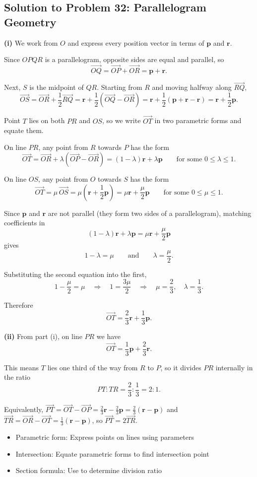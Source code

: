 \subsection{Solution to Problem 32: Parallelogram Geometry}

\begin{solution}
\textbf{(i)} We work from $O$ and express every position vector in terms of $\mathbf{p}$ and $\mathbf{r}$.

Since $OPQR$ is a parallelogram, opposite sides are equal and parallel, so
\[
\vec{OQ} = \vec{OP} + \vec{OR} = \mathbf{p} + \mathbf{r}.
\]

Next, $S$ is the midpoint of $QR$. Starting from $R$ and moving halfway along $\vec{RQ}$,
\[
\vec{OS} = \vec{OR} + \frac{1}{2}\vec{RQ}
= \mathbf{r} + \frac{1}{2}(\vec{OQ} - \vec{OR})
= \mathbf{r} + \frac{1}{2}(\mathbf{p} + \mathbf{r} - \mathbf{r})
= \mathbf{r} + \frac{1}{2}\mathbf{p}.
\]

Point $T$ lies on both $PR$ and $OS$, so we write $\vec{OT}$ in two parametric forms and equate them.

On line $PR$, any point from $R$ towards $P$ has the form
\[
\vec{OT} = \vec{OR} + \lambda(\vec{OP} - \vec{OR})
= (1-\lambda)\mathbf{r} + \lambda\mathbf{p}
\qquad \text{for some } 0 \le \lambda \le 1.
\]

On line $OS$, any point from $O$ towards $S$ has the form
\[
\vec{OT} = \mu\,\vec{OS}
= \mu\left(\mathbf{r} + \frac{1}{2}\mathbf{p}\right)
= \mu\mathbf{r} + \frac{\mu}{2}\mathbf{p}
\qquad \text{for some } 0 \le \mu \le 1.
\]

Since $\mathbf{p}$ and $\mathbf{r}$ are not parallel (they form two sides of a parallelogram), matching coefficients in
\[
(1-\lambda)\mathbf{r} + \lambda\mathbf{p}
= \mu\mathbf{r} + \frac{\mu}{2}\mathbf{p}
\]
gives
\[
1-\lambda = \mu \qquad \text{and} \qquad \lambda = \frac{\mu}{2}.
\]

Substituting the second equation into the first,
\[
1 - \frac{\mu}{2} = \mu
\quad\Longrightarrow\quad
1 = \frac{3\mu}{2}
\quad\Longrightarrow\quad
\mu = \frac{2}{3}, \quad \lambda = \frac{1}{3}.
\]

Therefore
\[
\vec{OT} = \frac{2}{3}\mathbf{r} + \frac{1}{3}\mathbf{p}.
\]

\textbf{(ii)} From part (i), on line $PR$ we have
\[
\vec{OT} = \frac{1}{3}\mathbf{p} + \frac{2}{3}\mathbf{r}.
\]

This means $T$ lies one third of the way from $R$ to $P$, so it divides $PR$ internally in the ratio
\[
PT : TR = \frac{2}{3} : \frac{1}{3} = 2 : 1.
\]

Equivalently, $\vec{PT} = \vec{OT} - \vec{OP} = \frac{2}{3}\mathbf{r} - \frac{2}{3}\mathbf{p} = \frac{2}{3}(\mathbf{r} - \mathbf{p})$ and $\vec{TR} = \vec{OR} - \vec{OT} = \frac{1}{3}(\mathbf{r} - \mathbf{p})$, so $\vec{PT} = 2\vec{TR}$.
\end{solution}

\begin{takeaways}
\begin{itemize}
    \item Parametric form: Express points on lines using parameters
    \item Intersection: Equate parametric forms to find intersection point
    \item Section formula: Use to determine division ratio
\end{itemize}
\end{takeaways}
